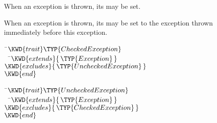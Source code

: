 When an exception is thrown, its  may be set. 


When an exception is thrown, its  may be set to the exception
thrown immediately before this exception.



\begin{Fortress}
{\tt~}\pushtabs\=\+\( \KWD{trait} \TYP{CheckedException} \)\\
{\tt~~}\pushtabs\=\+\(   \KWD{extends} \{\,\TYP{Exception}\,\}\)\\
\(   \KWD{excludes} \{\,\TYP{UncheckedException}\,\}\)\-\\\poptabs
\( \KWD{end}\)\-\\\poptabs
\end{Fortress}


\begin{Fortress}
{\tt~}\pushtabs\=\+\( \KWD{trait} \TYP{UncheckedException} \)\\
{\tt~~}\pushtabs\=\+\(   \KWD{extends} \{\,\TYP{Exception}\,\}\)\\
\(   \KWD{excludes} \{\,\TYP{CheckedException}\,\}\)\-\-\\\poptabs\poptabs
\(\KWD{end}\)
\end{Fortress}
